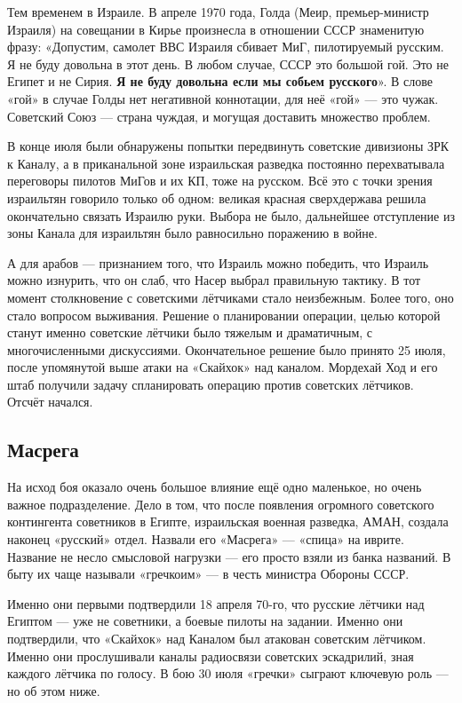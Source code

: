 Тем временем в Израиле. В апреле 1970 года, Голда (Меир, премьер-министр Израиля) на совещании в Кирье произнесла в отношении СССР знаменитую фразу: «Допустим, самолет ВВС Израиля сбивает МиГ, пилотируемый русским. Я не буду довольна в этот день. В любом случае, СССР это большой гой. Это не Египет и не Сирия. \textbf{Я не буду довольна если мы собьем русского}». В слове «гой» в случае Голды нет негативной коннотации, для неё «гой» — это чужак. Советский Союз — страна чуждая, и могущая доставить множество проблем.

В конце июля были обнаружены попытки передвинуть советские дивизионы ЗРК к Каналу, а в приканальной зоне израильская разведка постоянно перехватывала переговоры пилотов МиГов и их КП, тоже на русском. Всё это с точки зрения израильтян говорило только об одном: великая красная сверхдержава решила окончательно связать Израилю руки. Выбора не было, дальнейшее отступление из зоны Канала для израильтян было равносильно поражению в войне.

А для арабов — признанием того, что Израиль можно победить, что Израиль можно изнурить, что он слаб, что Насер выбрал правильную тактику. В тот момент столкновение с советскими лётчиками стало неизбежным. Более того, оно стало вопросом выживания. Решение о планировании операции, целью которой станут именно советские лётчики было тяжелым и драматичным, с многочисленными дискуссиями. Окончательное решение было принято 25 июля, после упомянутой выше атаки на «Скайхок» над каналом. Мордехай Ход и его штаб получили задачу спланировать операцию против советских лётчиков. Отсчёт начался.

\subsection{Масрега}

На исход боя оказало очень большое влияние ещё одно маленькое, но очень важное подразделение. Дело в том, что после появления огромного советского контингента советников в Египте, израильская военная разведка, АМАН, создала наконец «русский» отдел. Назвали его «Масрега» — «спица» на иврите. Название не несло смысловой нагрузки — его просто взяли из банка названий. В быту их чаще называли «гречкоим» — в честь министра Обороны СССР.

Именно они первыми подтвердили 18 апреля 70-го, что русские лётчики над Египтом — уже не советники, а боевые пилоты на задании. Именно они подтвердили, что «Скайхок» над Каналом был атакован советским лётчиком. Именно они прослушивали каналы радиосвязи советских эскадрилий, зная каждого лётчика по голосу. В бою 30 июля «гречки» сыграют ключевую роль — но об этом ниже.

